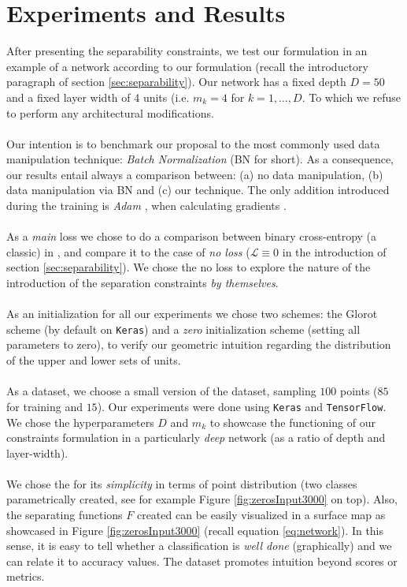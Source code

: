 

\section{Experiments and Results}\label{sec:experiments}

After presenting the separability constraints, we test our formulation in an example of a network according to our formulation (recall the introductory paragraph of section \ref{sec:separability}). Our network has a fixed depth $D=50$ and a fixed layer width of 4 units (i.e. $m_k=4$ for $k=1,\ldots,D$. To which we refuse to perform any architectural modifications. 
\\\\
Our intention is to benchmark our proposal to the most commonly used data manipulation technique: \emph{Batch Normalization} (BN for short). As a consequence, our results entail always a comparison between: (a) no data manipulation, (b) data manipulation via BN and (c) our technique. The only addition introduced during the training is \emph{Adam} \cite{adam}, when calculating gradients \cite{Goodfellow-et-al-2016}.  
\\\\
As a \emph{main} loss we chose to do a comparison between binary cross-entropy (a classic) in \cite{LeCun06atutorial}, and compare it to the case of \emph{no loss} ($\mathcal{L}\equiv 0$ in the introduction of section \ref{sec:separability}). We chose the no loss to explore the nature of the introduction of the separation constraints \emph{by themselves}.     
\\\\
As an initialization for all our experiments we chose two schemes: the Glorot scheme \cite{Glorot10Initialization} (by default on \texttt{Keras}) and a \emph{zero} initialization scheme (setting all parameters to zero), to verify our geometric intuition regarding the distribution of the upper and lower sets of units.   
\\\\
As a dataset, we choose a small version of the \moons dataset, sampling $100$ points ($85$ for training and $15$). Our experiments were done using \texttt{Keras}\cite{keras} and \texttt{TensorFlow}\cite{tensorflow}. We chose the hyperparameters $D$ and $m_k$ to showcase the functioning of our constraints formulation in a particularly \emph{deep} network (as a ratio of depth and layer-width). 
\\\\
We chose the \moons for its \emph{simplicity} in terms of point distribution (two classes parametrically created, see for example Figure \ref{fig:zerosInput3000} on top). Also, the separating functions $F$ created can be easily visualized in a surface map as showcased in Figure \ref{fig:zerosInput3000} (recall equation \ref{eq:network}). In this sense, it is easy to tell whether a classification is \emph{well done} (graphically) and we can relate it to accuracy values. The \moons dataset promotes intuition beyond scores or metrics.  

